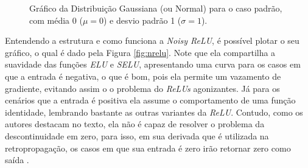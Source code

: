 \begin{figure}[htbp]
    \centering
    \caption{Gráfico da Distribuição Gaussiana (ou Normal) para o caso padrão, com média 0 ($\mu = 0$) e desvio padrão 1 ($\sigma = 1$).}
    \label{fig:distribuicao-normal-padrao}
\end{figure}

Entendendo a estrutura e como funciona a \textit{Noisy ReLU}, é possível plotar o seu gráfico, o qual é dado pela Figura \ref{fig:nrelu}. Note que ela compartilha a suavidade das funções \textit{ELU} e \textit{SELU}, apresentando uma curva para os casos em que a entrada é negativa, o que é bom, pois ela permite um vazamento de gradiente, evitando assim o o problema do \textit{ReLUs} agonizantes. Já para os cenários que a entrada é positiva ela assume o comportamento de uma função identidade, lembrando bastante as outras variantes da \textit{ReLU}. Contudo, como os autores destacam no texto, ela não é capaz de resolver o problema da descontinuidade em zero, para isso, em sua derivada que é utilizada na retropropagação, os casos em que sua entrada é zero irão retornar zero como saída \parencite{Nair2010}.

